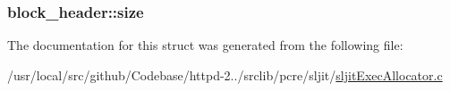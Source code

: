 \subsubsection[{\texorpdfstring{size}{size}}]{ block\+\_\+header\+::size}\hypertarget{structblock__header_ae6441882dc06eb9b353621fdf1edfaaf}{}\label{structblock__header_ae6441882dc06eb9b353621fdf1edfaaf}


The documentation for this struct was generated from the following file\+:\begin{DoxyCompactItemize}
\item 
/usr/local/src/github/\+Codebase/httpd-\/2../srclib/pcre/sljit/\hyperlink{sljitExecAllocator_8c}{sljit\+Exec\+Allocator.\+c}\end{DoxyCompactItemize}
